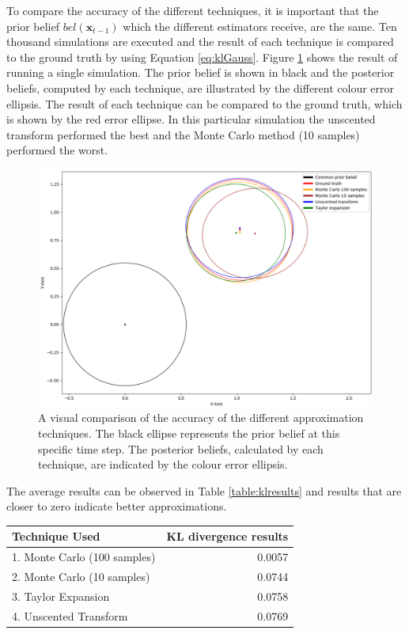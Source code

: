 \documentclass[12pt,oneside,openany,a4paper, %
afrikaans,english,
]{memoir}
\numberwithin{equation}{chapter}
\begin{document}
{To compare the accuracy of the different techniques, it is important that the prior belief $bel(\bm{x}_{t-1})$ which the different estimators receive, are the same. Ten thousand simulations are executed and the result of each technique is compared to the ground truth by using Equation \ref{eq:klGauss}. 
Figure \ref{fig:KL_visual} shows the result of running a single simulation. The prior belief is shown in black and the posterior beliefs, computed by each technique, are illustrated by the different colour error ellipsis. The result of each technique can be compared to the ground truth, which is shown by the red error ellipse. In this particular simulation the unscented transform performed the best and the Monte Carlo method (10 samples) performed the worst.
\begin{figure}[H]
  \includegraphics[width=\linewidth]{Figures/KL_result.png}
  \centering
  \caption[Visual comparison of the accuracy of the different approximation techniques]{A visual comparison of the accuracy of the different approximation techniques. The black ellipse represents the prior belief at this specific time step. The posterior beliefs, calculated by each technique, are indicated by the colour error ellipsis.}
  \label{fig:KL_visual}
\end{figure}
\pagebreak
The average results can be observed in Table \ref{table:klresults} and results that are closer to zero indicate better approximations.
\begin{table}[H]
\centering
\begin{tabular}{ |l|r| }
\hline
Technique Used & KL divergence results\\
\hline
1. Monte Carlo (100 samples) & 0.0057  \\ 
2. Monte Carlo (10 samples) & 0.0744 \\
3. Taylor Expansion & 0.0758\\ 
4. Unscented Transform & 0.0769 \\ 


\end{tabular}
\end{table}}
\end{document}
